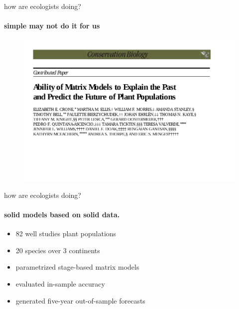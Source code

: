 \documentclass[show notes]{beamer}
\begin{document}
\begin{frame}{how are ecologists doing?}
  \framesubtitle{simple may not do it for us} 
  
  \begin{figure}
  \includegraphics[width=\textwidth]{matrix-model-prediction.pdf}
  \end{figure}
  
\end{frame}



\begin{frame}{how are ecologists doing?}
  \framesubtitle{solid models based on solid data.} 
  
   \begin{itemize}
   \item 82 well studies plant populations
   \item 20 species over 3 continents
   \item parametrized stage-based matrix models
   \item evaluated in-sample accuracy
   \item generated five-year out-of-sample forecasts
   \end{itemize}
  
\end{frame}
\end{document}
